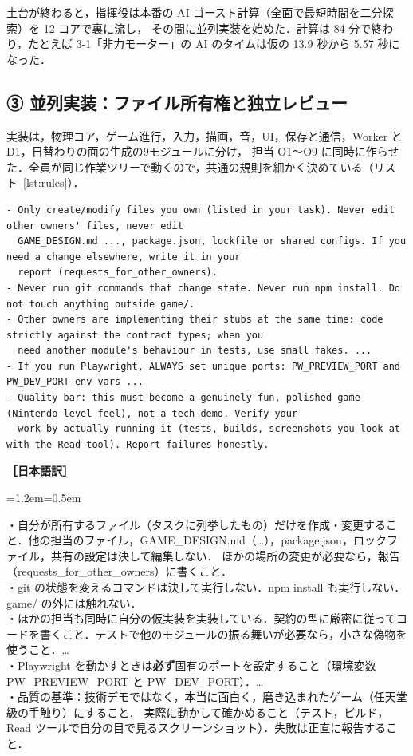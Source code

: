 \documentclass[a4paper,10pt]{ltjsarticle}
\newcommand{\lstref}[1]{リスト~\ref{#1}}
\newenvironment{yaku}{\par\vspace{-2pt}\small\noindent\textbf{［日本語訳］}\par\nopagebreak\begin{list}{}{\leftmargin=1.2em\rightmargin=0.5em\topsep=1pt}\item\relax}{\end{list}\vspace{4pt}}
\begin{document}
土台が終わると，指揮役は本番の AI ゴースト計算（全面で最短時間を二分探索）を 12 コアで裏に流し，
その間に並列実装を始めた．計算は 84 分で終わり，たとえば 3-1「非力モーター」の AI のタイムは仮の 13.9 秒から 5.57 秒になった．

\subsection{③ 並列実装：ファイル所有権と独立レビュー}

実装は，物理コア，ゲーム進行，入力，描画，音，UI，保存と通信，Worker と D1，日替わりの面の生成の9モジュールに分け，
担当 O1〜O9 に同時に作らせた．全員が同じ作業ツリーで動くので，共通の規則を細かく決めている（\lstref{lst:rules}）．

\begin{lstlisting}[caption={並列実装の共通規則（抜粋）},label={lst:rules}]
- Only create/modify files you own (listed in your task). Never edit other owners' files, never edit
  GAME_DESIGN.md ..., package.json, lockfile or shared configs. If you need a change elsewhere, write it in your
  report (requests_for_other_owners).
- Never run git commands that change state. Never run npm install. Do not touch anything outside game/.
- Other owners are implementing their stubs at the same time: code strictly against the contract types; when you
  need another module's behaviour in tests, use small fakes. ...
- If you run Playwright, ALWAYS set unique ports: PW_PREVIEW_PORT and PW_DEV_PORT env vars ...
- Quality bar: this must become a genuinely fun, polished game (Nintendo-level feel), not a tech demo. Verify your
  work by actually running it (tests, builds, screenshots you look at with the Read tool). Report failures honestly.
\end{lstlisting}
\begin{yaku}
・自分が所有するファイル（タスクに列挙したもの）だけを作成・変更すること．他の担当のファイル，GAME\_DESIGN.md（…），package.json，ロックファイル，共有の設定は決して編集しない．
ほかの場所の変更が必要なら，報告（requests\_for\_other\_owners）に書くこと．\\
・git の状態を変えるコマンドは決して実行しない．npm install も実行しない．game/ の外には触れない．\\
・ほかの担当も同時に自分の仮実装を実装している．契約の型に厳密に従ってコードを書くこと．テストで他のモジュールの振る舞いが必要なら，小さな偽物を使うこと．…\\
・Playwright を動かすときは\textbf{必ず}固有のポートを設定すること（環境変数 PW\_PREVIEW\_PORT と PW\_DEV\_PORT）．…\\
・品質の基準：技術デモではなく，本当に面白く，磨き込まれたゲーム（任天堂級の手触り）にすること．
実際に動かして確かめること（テスト，ビルド，Read ツールで自分の目で見るスクリーンショット）．失敗は正直に報告すること．
\end{yaku}
\end{document}
